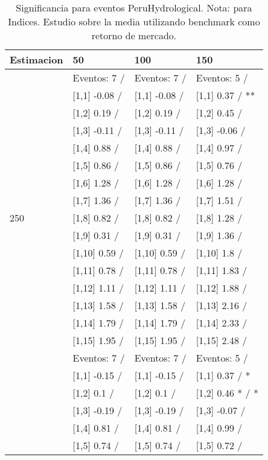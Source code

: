 \begin{table}

\caption{Significancia para eventos PeruHydrological. Nota: para Indices. Estudio sobre la media utilizando benchmark como retorno de mercado.}
\centering
\begin{tabular}[t]{llll}
\toprule
Estimacion & 50 & 100 & 150\\
\midrule
 & Eventos:  7 / & Eventos:  7 / & Eventos:  5 /\\
 & {}[1,1] -0.08  / & {}[1,1] -0.08  / & {}[1,1] 0.37  / **\\
 & {}[1,2] 0.19  / & {}[1,2] 0.19  / & {}[1,2] 0.45  /\\
 & {}[1,3] -0.11  / & {}[1,3] -0.11  / & {}[1,3] -0.06  /\\
 & {}[1,4] 0.88  / & {}[1,4] 0.88  / & {}[1,4] 0.97  /\\
\addlinespace
 & {}[1,5] 0.86  / & {}[1,5] 0.86  / & {}[1,5] 0.76  /\\
 & {}[1,6] 1.28  / & {}[1,6] 1.28  / & {}[1,6] 1.28  /\\
 & {}[1,7] 1.36  / & {}[1,7] 1.36  / & {}[1,7] 1.51  /\\
250 & {}[1,8] 0.82  / & {}[1,8] 0.82  / & {}[1,8] 1.28  /\\
 & {}[1,9] 0.31  / & {}[1,9] 0.31  / & {}[1,9] 1.36  /\\
\addlinespace
 & {}[1,10] 0.59  / & {}[1,10] 0.59  / & {}[1,10] 1.8  /\\
 & {}[1,11] 0.78  / & {}[1,11] 0.78  / & {}[1,11] 1.83  /\\
 & {}[1,12] 1.11  / & {}[1,12] 1.11  / & {}[1,12] 1.88  /\\
 & {}[1,13] 1.58  / & {}[1,13] 1.58  / & {}[1,13] 2.16  /\\
 & {}[1,14] 1.79  / & {}[1,14] 1.79  / & {}[1,14] 2.33  /\\
\addlinespace
 & {}[1,15] 1.95  / & {}[1,15] 1.95  / & {}[1,15] 2.48  /\\
 & Eventos:  7 / & Eventos:  7 / & Eventos:  5 /\\
 & {}[1,1] -0.15  / & {}[1,1] -0.15  / & {}[1,1] 0.37  / *\\
 & {}[1,2] 0.1  / & {}[1,2] 0.1  / & {}[1,2] 0.46 * / *\\
 & {}[1,3] -0.19  / & {}[1,3] -0.19  / & {}[1,3] -0.07  /\\
\addlinespace
 & {}[1,4] 0.81  / & {}[1,4] 0.81  / & {}[1,4] 0.99  /\\
 & {}[1,5] 0.74  / & {}[1,5] 0.74  / & {}[1,5] 0.72  /\\

\end{tabular}
\end{table}
